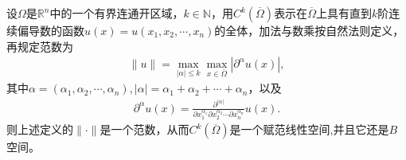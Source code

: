 \documentclass[../../main.tex]{subfiles}%
\begin{document}
\begin{proposition}\label{examples:常见的B空间222222}
设$\Omega$是$\mathbb{R}^n$中的一个有界连通开区域，$k \in \mathbb{N}$，用$C^k(\overline{\Omega})$表示在$\overline{\Omega}$上具有直到$k$阶连续偏导数的函数$u(x)=u(x_1,x_2,\cdots,x_n)$的全体，加法与数乘按自然法则定义，再规定范数为
\begin{align}
\|u\| = \max\limits_{|\alpha|\leqslant k} \max\limits_{x \in \overline{\Omega}} |\partial^\alpha u(x)|,
\end{align}
其中$\alpha = (\alpha_1,\alpha_2,\cdots,\alpha_n), |\alpha| = \alpha_1+\alpha_2+\cdots+\alpha_n$，以及
\begin{align*}
\partial^\alpha u(x) = \frac{\partial^{|\alpha|}}{\partial x_1^{\alpha_1} \partial x_2^{\alpha_2} \cdots \partial x_n^{\alpha_n}} u(x).
\end{align*}
则上述定义的$\|\cdot\|$是一个范数，从而$C^k(\overline{\Omega})$是一个赋范线性空间,并且它还是$B$空间。
\end{proposition}
\end{document}
